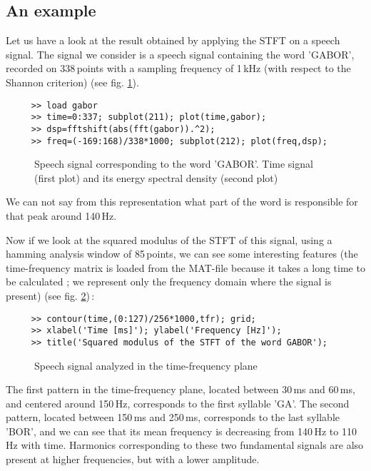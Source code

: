 \subsection{An example}
  Let us have a look at the result obtained by applying the STFT on a
speech signal. The signal we consider is a speech signal containing the
word 'GABOR', recorded on 338\,points with a sampling frequency of 1\,kHz
(with respect to the Shannon criterion) (see fig. \ref{At1fig3}).
\begin{verbatim}
     >> load gabor
     >> time=0:337; subplot(211); plot(time,gabor); 
     >> dsp=fftshift(abs(fft(gabor)).^2);
     >> freq=(-169:168)/338*1000; subplot(212); plot(freq,dsp); 
\end{verbatim}
\begin{figure}[htb]
\epsfxsize=10cm
\epsfysize=6cm
\centerline{}
\caption{\label{At1fig3}Speech signal corresponding to the word
'GABOR'. Time signal (first plot) and its energy spectral density (second
plot)}
\end{figure}
We can not say from this representation what part of the word is
responsible for that peak around 140\,Hz.

Now if we look at the squared modulus of the STFT of this signal, using a
hamming analysis window of 85\,points, we can see some interesting features
(the time-frequency matrix is loaded from the MAT-file because it takes a
long time to be calculated ; we represent only the frequency domain where
the signal is present) (see fig. \ref{At1fig4})\,:
\begin{verbatim}
     >> contour(time,(0:127)/256*1000,tfr); grid;
     >> xlabel('Time [ms]'); ylabel('Frequency [Hz]'); 
     >> title('Squared modulus of the STFT of the word GABOR');
\end{verbatim}
\begin{figure}[htb]
\epsfxsize=10cm
\epsfysize=8cm
\centerline{}
\caption{\label{At1fig4}Speech signal analyzed in the time-frequency plane}
\end{figure}
The first pattern in the time-frequency plane, located between 30\,ms and
60\,ms, and centered around 150\,Hz, corresponds to the first syllable
'GA'. The second pattern, located between 150\,ms and 250\,ms, corresponds
to the last syllable 'BOR', and we can see that its mean frequency is
decreasing from 140\,Hz to 110\,Hz with time. Harmonics corresponding to
these two fundamental signals are also present at higher frequencies, but
with a lower amplitude.


